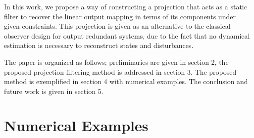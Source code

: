 \documentclass[twocolumn]{autart}    %
\begin{document}
In this work, we propose a way of constructing a projection that acts as a static filter to recover the linear output mapping in terms of its components under given constraints. This projection is given as an alternative to the classical observer design for output redundant systems, due to the fact that no dynamical estimation is necessary to reconstruct states and disturbances. 

The paper is organized as follows; preliminaries are given in section 2, the proposed projection filtering method is addressed in section 3. The proposed method is exemplified in section 4 with numerical examples. The conclusion and future work is given in section 5.




\section{Numerical Examples}







\end{document}
